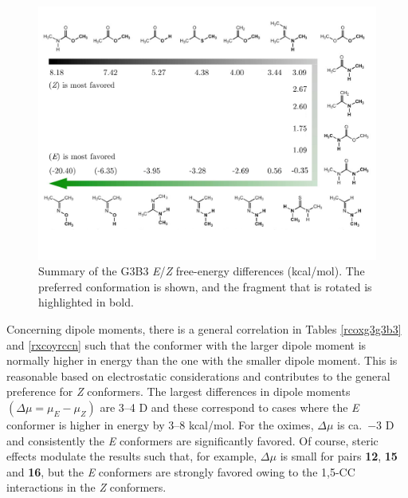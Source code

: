 \documentclass[12pt]{report}
\begin{document}
\begin{figure}[ht]
\centering
\includegraphics[scale=0.45]{figures/pdf/ezsum.pdf}
\caption{Summary of the G3B3 \textit{E}/\textit{Z} free-energy differences (kcal/mol). The preferred conformation is shown, and the fragment that is rotated is highlighted in bold.}
\label{ezsum}
\end{figure}

Concerning dipole moments, there is a general correlation in Tables \ref{rcoxg3g3b3} and \ref{rxcoyrccn} such that the conformer with the larger dipole moment is normally higher in energy than the one with the smaller dipole moment. This is reasonable based on electrostatic considerations and contributes to the general preference for \textit{Z} conformers. The largest differences in dipole moments $(\Delta \mu = \mu_E - \mu_Z)$ are 3--4 D and these correspond to cases where the \textit{E} conformer is higher in energy by 3--8 kcal/mol. For the oximes, $\Delta \mu$ is ca.\ $-3$ D and consistently the \textit{E} conformers are significantly favored. Of course, steric effects modulate the results such that, for example, $\Delta \mu$ is small for pairs \textbf{12}, \textbf{15} and \textbf{16}, but the \textit{E} conformers are strongly favored owing to the 1,5-CC interactions in the \textit{Z} conformers.

\end{document}

